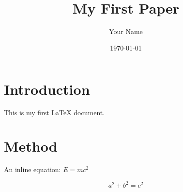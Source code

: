 \documentclass{article}
\title{My First Paper}
\author{Your Name}
\date{\today}
\begin{document}
\maketitle

\section{Introduction}
This is my first LaTeX document.

\section{Method}
An inline equation: \( E = mc^2 \)

\begin{equation}
a^2 + b^2 = c^2
\end{equation}
\end{document}
